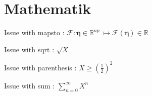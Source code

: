 \chapter{Mathematik}
\bigskip
Issue with mapsto : ${\mathcal F} : \boldsymbol{\eta} \in {\mathbb{R}}^{np}\ \mapsto {\mathcal F}\left(\boldsymbol{\eta} \right)\in \mathbb{R}$

\bigskip
Issue with sqrt : $\sqrt{X}$

\bigskip
Issue with parenthesis : $X \geqslant \left(\frac{1}{2}\right)^2$

\bigskip
Issue with sum : $\sum_{n=0}^\infty X^n$
        \tagmcend
\tagstructend
\newpage
